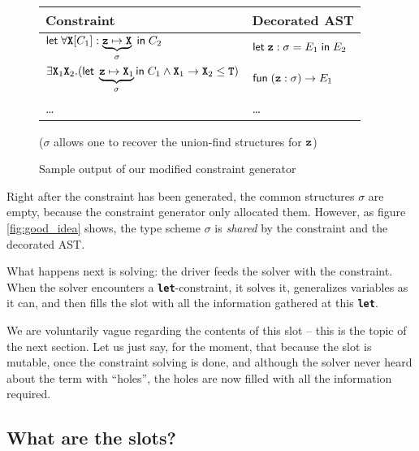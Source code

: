 \documentclass[10pt,a4paper,twoside,titlepage,twocolumn]{article}
\newcommand{\code}[1]{\textbf{\texttt{#1}}}
\begin{document}
\begin{figure}[h!]
  \small
    \begin{tabular}{l|l}
      \textbf{Constraint} & \textbf{Decorated AST} \\
      \hline


      $\cxlet{
          \forall\tvar[C_1]: \underbrace{\evar\mapsto\tvar}_{\sigma}
        }{C_2}$ &
        
      $\cxlet {\evar:\ts = E_1} {E_2}$ \\

      \hline


      $\exists\tvar_1\tvar_2.(
        \kwd{let}\;\underbrace{\evar\mapsto\tvar_1}_\sigma
        \kwd{in}\;{C_1}
        \wedge
        \tvar_1\arw\tvar_2\subtype\ttyp)$ &

      $\kwd{fun}\;(\evar: \sigma) \to E_1$ \\

      \hline

      \dots & \dots

    \end{tabular}
    (\centering $\sigma$ allows one to recover the union-find structures for $\evar$)
  \caption{Sample output of our modified constraint generator}
  \label{fig:good_idea}
\end{figure}

Right after the constraint has been generated, the common structures $\sigma$
are empty, because the constraint generator only allocated them. However, as
figure \vref{fig:good_idea} shows, the type scheme $\sigma$ is \emph{shared} by
the constraint and the decorated AST.

What happens next is solving: the driver feeds the solver with the constraint.
When the solver encounters a \code{let}-constraint, it solves it, generalizes
variables as it can, and then fills the slot with all the information gathered
at this \code{let}.

We are voluntarily vague regarding the contents of this slot -- this is the
topic of the next section. Let us just say, for the moment, that because the
slot is mutable, once the constraint solving is done, and although the solver
never heard about the term with ``holes'', the holes are now filled with all the
information required.

\subsection{What are the slots?}
\end{document}
